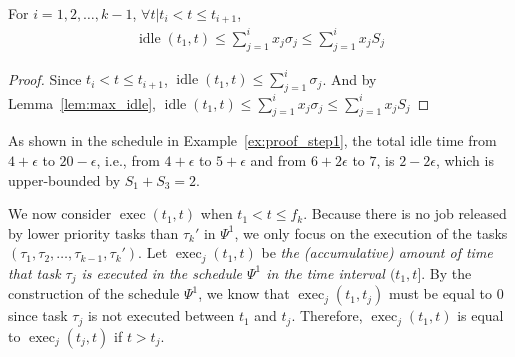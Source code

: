 \begin{Corollary}
\label{lem:bound_idle}
For $i=1,2,\ldots,k-1$, $\forall t | t_{i} < t \leq t_{i+1}$, 
\begin{align}
\label{eq:sumof-sigma}
\operatorname{idle}(t_1, t) \leq \sum_{j=1}^{i} x_j \sigma_j \leq
  \sum_{j=1}^{i} x_j S_j
\end{align}
\end{Corollary}
\begin{proof}
Since $t_{i} < t \leq t_{i+1}$, $\operatorname{idle}(t_1, t) \leq \sum_{j=1}^{i} \sigma_j$. And by Lemma~\ref{lem:max_idle}, $\operatorname{idle}(t_1, t) \leq \sum_{j=1}^{i} x_j \sigma_j \leq \sum_{j=1}^{i} x_j S_j$
\end{proof}

\begin{example}
As shown in the schedule in Example~\ref{ex:proof_step1}, the total idle time from $4+\epsilon$ to
$20-\epsilon$, i.e., from $4+\epsilon$ to $5+\epsilon$ and from
$6+2\epsilon$ to $7$, is $2-2\epsilon$, which is upper-bounded by $S_1+S_3 = 2$. 
\end{example}

%


We now consider $\operatorname{exec}(t_1, t)$ when $t_1 < t \leq f_k$.
Because there is no job released by lower priority tasks than
$\tau_k'$ in $\Psi^1$, we only focus on the execution of the
tasks $(\tau_1, \tau_2, \ldots, \tau_{k-1}, \tau_k')$. Let
$\operatorname{exec}_j(t_1, t)$ be \emph{the
 (accumulative) amount of time that task $\tau_j$ is executed in the schedule
  $\Psi^1$ in the time interval $(t_1, t]$}. By the construction of the
schedule $\Psi^1$, we know that $\operatorname{exec}_j(t_1, t_j)$ must
be equal to $0$ since task $\tau_j$ is not executed between $t_1$ and $t_j$. %
Therefore, $\operatorname{exec}_j(t_1, t)$ is equal to
$\operatorname{exec}_j(t_j, t)$ if $t > t_j$.

